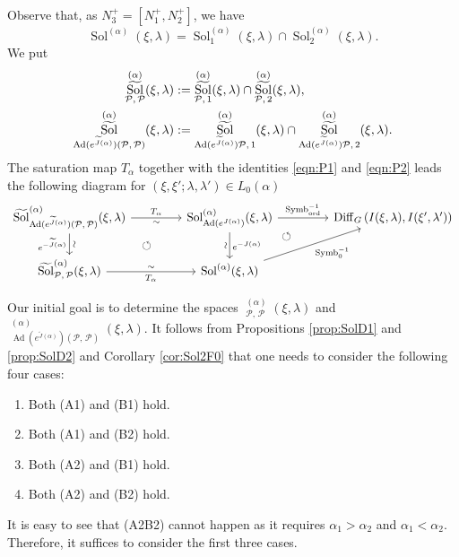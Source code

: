 \documentclass[a4paper,11pt,reqno]{amsart}
\newcommand{\calP}{\mathcal{P}}
\newcommand{\0}{{\bf 0}}
\newcommand{\1}{{\bf 1}}
\DeclareMathOperator{\Ad}{Ad}
\newcommand{\ord}{{\mathrm{ord}}}
\DeclareMathOperator{\Diff}{Diff}
\DeclareMathOperator{\Sol}{Sol}
\newcommand{\wJ}{\widetilde{J}}
\DeclareMathOperator{\Symb}{Symb}
\DeclareMathOperator{\wSol}{\widetilde{\Sol}}
\theoremstyle{plain}
\theoremstyle{definition}
\numberwithin{equation}{section}
\theoremstyle{definition}
\begin{document}
Observe that,  as $N_3^+=[N_1^+, N_2^+]$,
we have 
\begin{equation*}
\Sol^{(\alpha)}(\xi,\lambda) = 
\Sol_1^{(\alpha)}(\xi,\lambda)
\cap
\Sol_2^{(\alpha)}(\xi,\lambda).
\end{equation*}
We put
\begin{align*}
\wSol_{\calP,\, \calP}^{(\alpha)}(\xi,\lambda)
&:=
\wSol_{\calP,\, 1}^{(\alpha)}(\xi,\lambda) \cap
\wSol_{\calP,\, 2}^{(\alpha)}(\xi,\lambda),\\
\vspace{5pt}
\wSol_{\Ad(e^{\wJ(\alpha)})(\calP,\, \calP)}^{(\alpha)}
(\xi,\lambda)
&:=
\wSol_{\Ad(e^{\wJ(\alpha)}) \calP,\, 1}^{(\alpha)}
(\xi,\lambda)
\cap
\wSol_{\Ad(e^{\wJ(\alpha)}) \calP,\, 2}^{(\alpha)}
(\xi,\lambda).
\end{align*}
The saturation map $T_\alpha$ 
together with the identities \eqref{eqn:P1} and \eqref{eqn:P2}
leads the following diagram for $(\xi,\xi';\lambda,\lambda')\in L_0(\alpha)$\begin{equation}\label{eqn:cdSol3b}
\begin{tikzcd}[column sep=1.5cm]
	{\wSol_{\Ad(e^{\wJ(\alpha)})(\calP,\, \calP)}^{(\alpha)}(\xi,\lambda)} & 
	\Sol_{\Ad(e^{J(\alpha)})}^{(\alpha)}(\xi,\lambda)  	
	\arrow[dl, pos=0.5, phantom, "\circlearrowleft"]
	&{\Diff_{G}\left(I(\xi, \lambda), I(\xi', \lambda')\right)} \\
	{\wSol_{\calP,\,\calP}^{(\alpha)}(\xi,\lambda)}  & {\Sol^{(\alpha)}(\xi,\lambda)} &
	\arrow[ul, pos=0.886, phantom, "\circlearrowleft"]
	\arrow["\Symb_{\ord}^{-1}", from=1-2, to=1-3]
	\arrow["\Symb_0^{-1}"', from=2-2, to=1-3]
	\arrow["{T_\alpha}", "\sim"' , from=1-1, to=1-2]
	\arrow["\sim" sloped, "e^{-\wJ(\alpha)}"', from=1-1, to=2-1]
	\arrow["e^{-J(\alpha)}", "\sim"' sloped,  from=1-2, to=2-2]
	\arrow["\sim" , "{T_\alpha}"',  from=2-1, to=2-2]
\end{tikzcd}
\end{equation}

Our initial goal is to determine 
the spaces 
$\wSol_{\calP,\, \calP}^{(\alpha)}(\xi,\lambda)$
and 
$\wSol_{\Ad(e^{\wJ(\alpha)})(\calP,\, \calP)}^{(\alpha)}(\xi,\lambda)$.
It follows from 
Propositions \ref{prop:SolD1} and \ref{prop:SolD2} and
Corollary \ref{cor:Sol2F0} that one needs to consider 
the following four cases:
\begin{enumerate}[label=\normalfont{(\arabic*)}]
\item[(A1B1)] Both (A1) and (B1) hold.
\vspace{5pt}
\item[(A1B2)] Both (A1) and (B2) hold.
\vspace{5pt}
\item[(A2B1)] Both (A2) and (B1) hold.
\vspace{5pt}
\item[(A2B2)] Both (A2) and (B2) hold.
\vspace{5pt}
\end{enumerate}
It is easy to see that (A2B2) cannot happen as it requires
$\alpha_1 > \alpha_2$ and $\alpha_1 < \alpha_2$. Therefore, it suffices to consider
the first three cases. 
\end{document}
